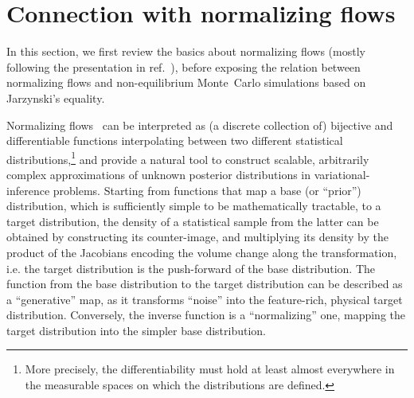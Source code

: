 \documentclass[11pt]{article}
\begin{document}
\section{Connection with normalizing flows}
\label{sec:connection_with_normalizing_flows}

In this section, we first review the basics about normalizing flows (mostly following the presentation in ref.~\cite{Wu:2020snf}), before exposing the relation between normalizing flows and non-equilibrium Monte~Carlo simulations based on Jarzynski's equality.

Normalizing flows~\cite{Tabak2010:deb, JimenezRezende:2015viw, Kobyzev:2019nfa, Papamakarios:2021nff} can be interpreted as (a discrete collection of) bijective and differentiable functions interpolating between two different statistical distributions,\footnote{More precisely, the differentiability must hold at least almost everywhere in the measurable spaces on which the distributions are defined.} and provide a natural tool to construct scalable, arbitrarily complex approximations of unknown posterior distributions in variational-inference problems. Starting from functions that map a base (or ``prior'') distribution, which is sufficiently simple to be mathematically tractable, to a target distribution, the density of a statistical sample from the latter can be obtained by constructing its counter-image, and multiplying its density by the product of the Jacobians encoding the volume change along the transformation, i.e. the target distribution is the push-forward of the base distribution. The function from the base distribution to the target distribution can be described as a ``generative'' map, as it transforms ``noise'' into the feature-rich, physical target distribution. Conversely, the inverse function is a ``normalizing'' one, mapping the target distribution into the simpler base distribution.
\end{document}
